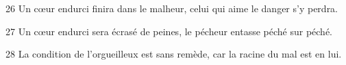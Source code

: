 
26 Un cœur endurci finira dans le malheur, celui qui aime le danger s’y perdra.

27 Un cœur endurci sera écrasé de peines, le pécheur entasse péché sur péché.

28 La condition de l’orgueilleux est sans remède, car la racine du mal est en lui.
